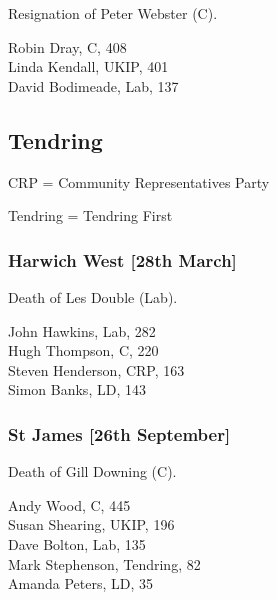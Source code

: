 \documentclass[a4paper,openany,10pt]{book}
\begin{document}

Resignation of Peter Webster (C).



Robin Dray, C, 408\\
Linda Kendall, UKIP, 401\\
David Bodimeade, Lab, 137\\


\subsection*{Tendring}

CRP = Community Representatives Party

Tendring = Tendring First

\subsubsection*{Harwich West \hspace*{\fill}\nolinebreak[1]%
\enspace\hspace*{\fill}
[28th March]}


Death of Les Double (Lab).



John Hawkins, Lab, 282\\
Hugh Thompson, C, 220\\
Steven Henderson, CRP, 163\\
Simon Banks, LD, 143\\


\subsubsection*{St James \hspace*{\fill}\nolinebreak[1]%
\enspace\hspace*{\fill}
[26th September]}


Death of Gill Downing (C).



Andy Wood, C, 445\\
Susan Shearing, UKIP, 196\\
Dave Bolton, Lab, 135\\
Mark Stephenson, Tendring, 82\\
Amanda Peters, LD, 35\\
\end{document}
